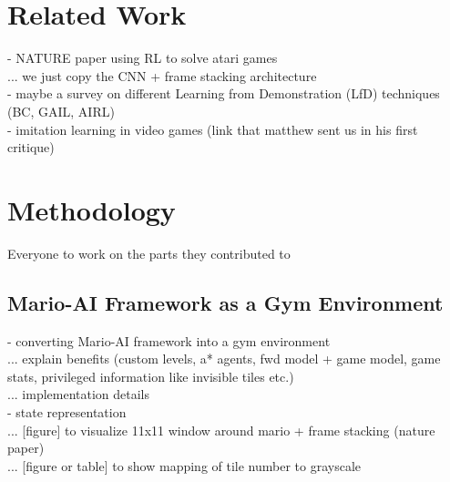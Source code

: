 \documentclass[letterpaper]{article} %
\begin{document}
\section{Related Work}



- NATURE paper using RL to solve atari games\\
... we just copy the CNN + frame stacking architecture\\
- maybe a survey on different Learning from Demonstration (LfD) techniques (BC, GAIL, AIRL)\\
- imitation learning in video games (link that matthew sent us in his first critique)\\

\section{Methodology}

Everyone to work on the parts they contributed to

\subsection{Mario-AI Framework as a Gym Environment}

- converting Mario-AI framework into a gym environment\\
    ... explain benefits (custom levels, a* agents, fwd model + game model, game stats, privileged information like invisible tiles etc.)\\
    ... implementation details\\

- state representation\\
    ... [figure] to visualize 11x11 window around mario + frame stacking (nature paper)\\
    ... [figure or table] to show mapping of tile number to grayscale\\
    
\end{document}
